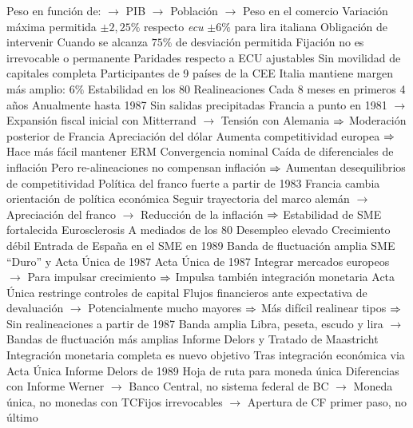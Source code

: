 \documentclass{nuevotema}
\begin{document}
\begin{esquemal}
				\4[] Peso en función de:
				\4[] $\to$ PIB
				\4[] $\to$ Población
				\4[] $\to$ Peso en el comercio
				\4 Variación máxima permitida
				\4[] $\pm 2,25\%$ respecto \textit{ecu}
				\4[] $\pm 6\%$ para lira italiana
				\4 Obligación de intervenir
				\4[] Cuando se alcanza $75\%$ de desviación permitida
				\4 Fijación no es irrevocable o permanente
				\4[] Paridades respecto a ECU ajustables
				\4 Sin movilidad de capitales completa
				\4 Participantes
				 de 9 países de la CEE
				\4[] Italia mantiene margen más amplio: $6\%$
			\3 Estabilidad en los 80
				\4 Realineaciones
				\4[] Cada 8 meses en primeros 4 años
				\4[] Anualmente hasta 1987
				\4 Sin salidas precipitadas
				\4[] Francia a punto en 1981
				\4[] $\to$ Expansión fiscal inicial con Mitterrand
				\4[] $\to$ Tensión con Alemania
				\4[] $\Rightarrow$ Moderación posterior de Francia
				\4 Apreciación del dólar
				\4[] Aumenta competitividad europea
				\4[] $\Rightarrow$ Hace más fácil mantener ERM
				\4 Convergencia nominal
				\4[] Caída de diferenciales de inflación
				\4[] Pero re-alineaciones no compensan inflación
				\4[] $\Rightarrow$ Aumentan desequilibrios de competitividad
				\4 Política del franco fuerte a partir de 1983
				\4[] Francia cambia orientación de política económica
				\4[] Seguir trayectoria del marco alemán
				\4[] $\to$ Apreciación del franco
				\4[] $\to$ Reducción de la inflación
				\4[] $\Rightarrow$ Estabilidad de SME fortalecida
				\4 Eurosclerosis
				\4[] A mediados de los 80
				\4[] Desempleo elevado
				\4[] Crecimiento débil
				\4 Entrada de España en el SME en 1989
				\4[] Banda de fluctuación amplia
			\3 SME ``Duro'' y Acta Única de 1987
				\4 Acta Única de 1987
				\4[] Integrar mercados europeos
				\4[] $\to$ Para impulsar crecimiento
				\4[] $\Rightarrow$ Impulsa también integración monetaria
				\4 Acta Única restringe controles de capital
				\4[] Flujos financieros ante expectativa de devaluación
				\4[] $\to$ Potencialmente mucho mayores
				\4[] $\Rightarrow$ Más difícil realinear tipos
				\4[] $\Rightarrow$ Sin realineaciones a partir de 1987
				\4 Banda amplia
				\4[] Libra, peseta, escudo y lira
				\4[] $\to$ Bandas de fluctuación más amplias
			\3 Informe Delors y Tratado de Maastricht
				\4 Integración monetaria completa es nuevo objetivo
				\4[] Tras integración económica via Acta Única
				\4 Informe Delors de 1989
				\4[] Hoja de ruta para moneda única
				\4 Diferencias con Informe Werner
				\4[] $\to$ Banco Central, no sistema federal de BC
				\4[] $\to$ Moneda única, no monedas con TCFijos irrevocables
				\4[] $\to$ Apertura de CF primer paso, no último

\end{esquemal}
\end{document}
